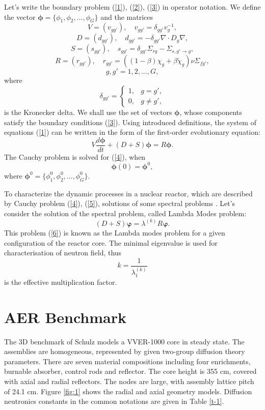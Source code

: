 \documentclass[runningheads,a4paper]{llncs}
\begin{document}
Let's write the boundary problem (\ref{1}), (\ref{2}), (\ref{3}) in operator notation. 
We define the vector $\bm \phi = \{\phi_1, \phi_2, ..., \phi_G\}$ and the matrices
\[
 V = (v_{g g'}),
 \quad v_{g g'} = \delta_{g g'} v_g^{-1},
\] 
\[
 D = (d_{g g'}),
 \quad d_{g g'} = - \delta_{g g'} \nabla \cdot D_g \nabla,
\] 
\[
 S = (s_{g g'}),
 \quad  s_{g g'} =  \delta_{g g'} \Sigma_{rg} - \Sigma_{s,g'\rightarrow g} ,
\] 
\[
 R = (r_{g g'}),
 \quad  r_{g g'} = ( (1-\beta) \chi_g + \beta \widetilde{\chi}_g) \nu \Sigma_{fg'} ,
\]
\[
g, g' = 1,2, ..., G,
\] 
where
\[
 \delta_{g g'} = \left \{ 
 \begin{matrix}
 1, & g = g', \\
 0, & g \neq  g',
 \end{matrix}
 \right . 
\] 
is the Kronecker delta. We shall use the set of vectors $\bm \phi$,  whose components satisfy the boundary conditions
(\ref{3}). Using introduced definitions, the system of equations (\ref{1}) can be written in the form of the first-order evolutionary equation:
\begin{equation}\label{4}
 V \frac{d \bm \phi}{d t} + (D+S) \bm \phi = R \bm \phi .
\end{equation}  
The Cauchy problem is solved for (\ref{4}), when
\begin{equation}\label{5}
 \bm \phi(0) = \bm \phi^0,
\end{equation} 
where $\bm \phi^0 = \{ \phi_1^0,  \phi_2^0, ...,  \phi_G^0 \}$.

To characterize the dynamic processes in a nuclear reactor, which are described by Cauchy problem (\ref{4}), (\ref{5}), solutions of some spectral problems  \cite{publicAnnnals2017}. Let's consider the solution of the spectral problem, called Lambda Modes problem:
\begin{equation}\label{6}
 (D+S) \bm \varphi  = \lambda^{(k)} R \bm \varphi .
\end{equation} 
This problem (\ref{6}) is known as the Lambda modes problem for a given configuration of the reactor core.
The minimal eigenvalue is used for characterisation of neutron field, thus 
\[
 k = \frac{1}{\lambda^{(k)}_1}  
\] 
is the effective multiplication factor.

\section{AER Benchmark}
The 3D benchmark of Schulz \cite{schulz1996} models a VVER-1000 core in steady state. The assemblies are homogeneous, represented by given two-group diffusion theory parameters. There are seven material compositions including four enrichments, burnable absorber, control rods and reflector. The core height is 355 cm, covered with axial and radial reflectors. The nodes are large, with assembly lattice pitch of 24.1 cm. Figure \ref{fig:1} shows the radial and axial geometry models.  Diffusion neutronics constants in the common notations
are given in Table \ref{t-1}. 
\end{document}
